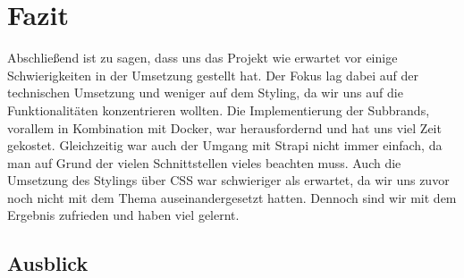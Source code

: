 \newpage

\section{Fazit} \label{fazit}
Abschließend ist zu sagen, dass uns das Projekt wie erwartet vor einige Schwierigkeiten in der Umsetzung gestellt hat.
Der Fokus lag dabei auf der technischen Umsetzung und weniger auf dem Styling, da wir uns auf die Funktionalitäten konzentrieren wollten.
Die Implementierung der Subbrands, vorallem in Kombination mit Docker, war herausfordernd und hat uns viel Zeit gekostet.
Gleichzeitig war auch der Umgang mit Strapi nicht immer einfach, da man auf Grund der vielen Schnittstellen vieles beachten muss.
Auch die Umsetzung des Stylings über CSS war schwieriger als erwartet, da wir uns zuvor noch nicht mit dem Thema auseinandergesetzt hatten.
Dennoch sind wir mit dem Ergebnis zufrieden und haben viel gelernt.
\subsection{Ausblick} \label{ausblick}
